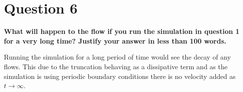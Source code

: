 \documentclass[10pt, a4paper]{article}
\begin{document}
\section*{Question 6}
\textbf{What will happen to the flow if you run the simulation in question 1 for a very long time? Justify your answer in less than 100 words.}

Running the simulation for a long period of time would see the decay of any flows. This due to the truncation behaving as a dissipative term and as the simulation is using periodic boundary conditions there is no velocity added as $t \rightarrow \infty$. 

\newpage
%
\end{document}
